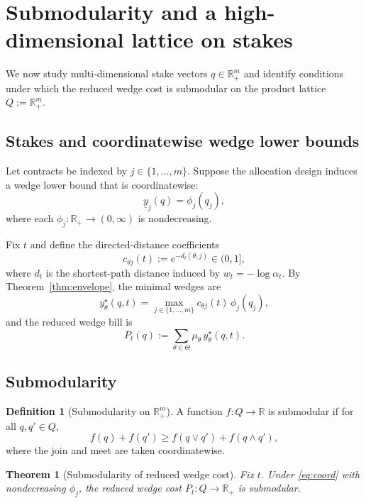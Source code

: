 \documentclass[final,3p,times]{elsarticle}
\theoremstyle{plain}
\newtheorem{theorem}{Theorem}
\theoremstyle{definition}
\newtheorem{definition}{Definition}
\newcommand{\R}{\mathbb{R}}
\newcommand{\1}{\mathbbm{1}}
\newcommand{\ThetaSet}{\Theta}
\begin{document}
\section{Submodularity and a high-dimensional lattice on stakes}\label{sec:submodularity}

We now study multi-dimensional stake vectors $q\in\R_+^m$ and identify conditions under which the reduced wedge cost is submodular on the product lattice $Q:=\R_+^m$.

\subsection{Stakes and coordinatewise wedge lower bounds}

Let contracts be indexed by $j\in\{1,\dots,m\}$. Suppose the allocation design induces a wedge lower bound that is coordinatewise:
\begin{equation}\label{eq:coord}
\underline y_j(q)=\phi_j(q_j),
\end{equation}
where each $\phi_j:\R_+\to(0,\infty)$ is nondecreasing.

Fix $t$ and define the directed-distance coefficients
\[
c_{\theta j}(t):=e^{-d_t(\theta,j)}\in(0,1],
\]
where $d_t$ is the shortest-path distance induced by $w_t=-\log \alpha_t$. By Theorem~\ref{thm:envelope}, the minimal wedges are
\begin{equation}\label{eq:yqt}
y^\star_\theta(q,t)=\max_{j\in\{1,\dots,m\}} c_{\theta j}(t)\,\phi_j(q_j),
\end{equation}
and the reduced wedge bill is
\[
P_t(q):=\sum_{\theta\in\ThetaSet}\mu_\theta\, y^\star_\theta(q,t).
\]

\subsection{Submodularity}

\begin{definition}[Submodularity on $\R_+^m$]
A function $f:Q\to\R$ is submodular if for all $q,q'\in Q$,
\[
f(q)+f(q')\ge f(q\vee q')+f(q\wedge q'),
\]
where the join and meet are taken coordinatewise.
\end{definition}

\begin{theorem}[Submodularity of reduced wedge cost]\label{thm:submodularity}
Fix $t$. Under \eqref{eq:coord} with nondecreasing $\phi_j$, the reduced wedge cost $P_t:Q\to\R_+$ is submodular.
\end{theorem}
\end{document}
